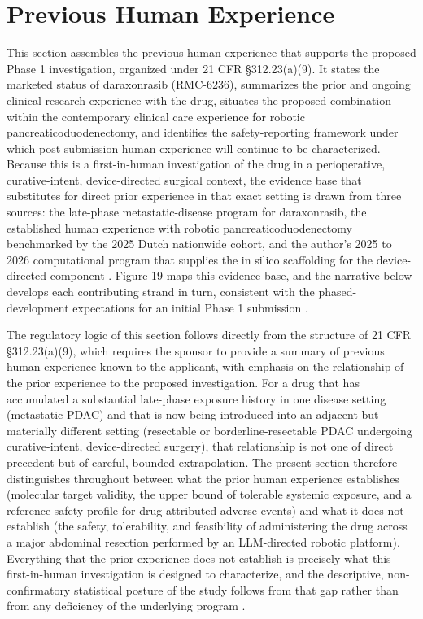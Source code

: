 \section{Previous Human Experience}

This section assembles the previous human experience that supports the proposed
Phase 1 investigation, organized under 21 CFR \S 312.23(a)(9). It states the
marketed status of daraxonrasib (RMC-6236), summarizes the prior and ongoing
clinical research experience with the drug, situates the proposed combination
within the contemporary clinical care experience for robotic
pancreaticoduodenectomy, and identifies the safety-reporting framework under
which post-submission human experience will continue to be characterized. Because
this is a first-in-human investigation of the drug in a perioperative,
curative-intent, device-directed surgical context, the evidence base that
substitutes for direct prior experience in that exact setting is drawn from three
sources: the late-phase metastatic-disease program for daraxonrasib, the
established human experience with robotic pancreaticoduodenectomy benchmarked by
the 2025 Dutch nationwide cohort, and the author's 2025 to 2026 computational
program that supplies the in silico scaffolding for the device-directed component
\cite{daraxwhipple, onpremwhippl}. Figure 19 maps this evidence base, and the
narrative below develops each contributing strand in turn, consistent with the
phased-development expectations for an initial Phase 1 submission
\cite{phase1guidance}.

The regulatory logic of this section follows directly from the structure of 21
CFR \S 312.23(a)(9), which requires the sponsor to provide a summary of previous
human experience known to the applicant, with emphasis on the relationship of the
prior experience to the proposed investigation. For a drug that has accumulated a
substantial late-phase exposure history in one disease setting (metastatic PDAC)
and that is now being introduced into an adjacent but materially different
setting (resectable or borderline-resectable PDAC undergoing curative-intent,
device-directed surgery), that relationship is not one of direct precedent but of
careful, bounded extrapolation. The present section therefore distinguishes
throughout between what the prior human experience establishes (molecular target
validity, the upper bound of tolerable systemic exposure, and a reference safety
profile for drug-attributed adverse events) and what it does not establish (the
safety, tolerability, and feasibility of administering the drug across a major
abdominal resection performed by an LLM-directed robotic platform). Everything
that the prior experience does not establish is precisely what this first-in-human
investigation is designed to characterize, and the descriptive, non-confirmatory
statistical posture of the study follows from that gap rather than from any
deficiency of the underlying program \cite{phase1guidance, daraxwhipple}.

